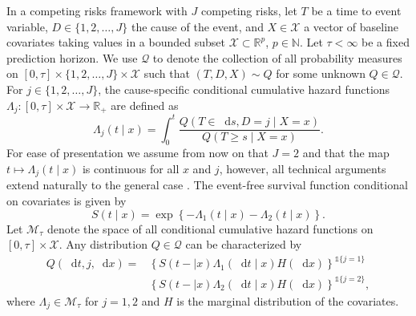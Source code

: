 \documentclass[a4paper,danish]{article}
\newcommand{\R}{\mathbb{R}}
\newcommand{\N}{\mathbb{N}}
\newcommand*\diff{\mathop{}\!\mathrm{d}}
\newcommand{\1}{\mathds{1}}
\theoremstyle{plain} %
\numberwithin{theorem}{section}
\theoremstyle{definition} %
\theoremstyle{remark}
\begin{document}
In a competing risks framework \citep{andersen2012statistical} with
\(J\) competing risks, let \( T\) be a time to event variable,
\(D\in\{1,2,\dots,J\}\) the cause of the event, and $X \in
\mathcal{X}$ a vector of baseline covariates taking values in a
bounded subset \( \mathcal{X} \subset \R^p \), \( p\in\N \). Let
$\tau< \infty$ be a fixed prediction horizon. We use \(\mathcal{Q} \)
to denote the collection of all probability measures on \( [0,\tau]
\times \{1,2,\dots,J\}\times \mathcal{X} \) such that \( (T, D, X) \sim Q \)
for some unknown \( Q \in \mathcal{Q} \). For \(j\in\{1,2,
\dots,J\}\), the cause-specific conditional cumulative hazard
functions \( \Lambda_{j} \colon [0, \tau] \times \mathcal{X}
\rightarrow \R_+ \) are defined as
\begin{equation*}
  \Lambda_{j}(t \mid x) = \int_0^t\frac{  Q(T \in \diff s, D=j \mid X=x )}{Q(T \geq s \mid X=x )}.
\end{equation*} For ease of presentation we assume from now on that
\(J=2\) and that the map \( t\mapsto \Lambda_j(t \mid x) \) is
continuous for all \( x \) and \( j \), however, all technical
arguments extend naturally to the general case
\citep{andersen2012statistical}.  The event-free survival function
conditional on covariates is given by
\begin{equation}
  \label{eq:surv-def}
  S(t \mid x)=\exp\left\{-\Lambda_{1}(t \mid x)-\Lambda_{2}(t \mid x)\right\}.
\end{equation}
Let \( \mathcal{M}_{\tau}\) denote the space of all conditional
cumulative hazard functions on \( [0,\tau] \times\mathcal{X}\). Any
distribution \( Q \in \mathcal{Q} \) can be characterized by
\begin{equation*}
  \label{eq:parametrizeQ}
  \begin{split}
    Q(\diff t,j,\diff x)=& \left\{S(t- \mid x)\Lambda_1(\diff t \mid x)H(\diff x)\right\}^{\1{\{j=1\}}}\\
                         &  \left\{S(t- \mid x)\Lambda_2(\diff t \mid x)H(\diff x)\right\}^{\1{\{j=2\}}},
  \end{split}
\end{equation*}
where \(\Lambda_{j} \in \mathcal{M}_{\tau}\) for \(j=1,2\) and \(H\) is the marginal
distribution of the covariates.
\end{document}
